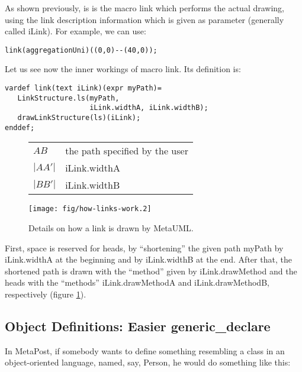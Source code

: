 \documentclass{article}
\newcommand{\code}{\ttfamily}
\newcommand{\metauml}{MetaUML}
\begin{document}
As shown previously, is is the macro {\code link} which
performs the actual drawing, using the link description information
which is given as parameter (generally called {\code iLink}).
For example, we can use:

\begin{verbatim}
link(aggregationUni)((0,0)--(40,0));
\end{verbatim}


Let us see now the inner workings of macro {\code link}. Its definition is:

\begin{verbatim}
vardef link(text iLink)(expr myPath)=
   LinkStructure.ls(myPath,
                    iLink.widthA, iLink.widthB);
   drawLinkStructure(ls)(iLink);
enddef;
\end{verbatim}

\begin{figure}
\centering
\begin{tabular}{l|l}
$AB$ & the path specified by the user \\
$|AA'|$ & {\code iLink.widthA}\\
$|BB'|$ & {\code iLink.widthB}
\end{tabular}
\texttt{[image: fig/how-links-work.2]}
\caption{Details on how a link is drawn by \metauml.}
\label{fig:hlw2}
\end{figure}

First, space is reserved for heads, by ``shortening'' the given path {\code myPath}
by {\code iLink.widthA} at the beginning and by {\code iLink.widthB} at the end.
After that, the shortened path is drawn with the ``method''
given by {\code iLink.drawMethod} and the heads with the ``methods''
{\code iLink.drawMethodA} and {\code iLink.drawMethodB},
respectively (figure \ref{fig:hlw2}).

\subsection{Object Definitions: Easier {\code generic\_declare}}

In MetaPost, if somebody wants to define something resembling a class in an object-oriented language,
named, say, {\code Person}, he would do something like this:
\end{document}
